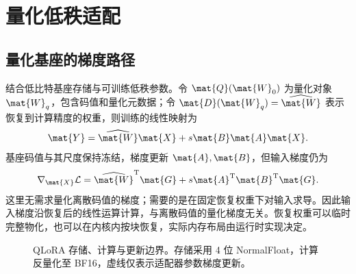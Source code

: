 \documentclass[../textbook.tex]{subfiles}
\begin{document}
\section{量化低秩适配}

\subsection{量化基座的梯度路径}
结合低比特基座存储与可训练低秩参数\cite{dettmers2023qlora}。令 $\mat{Q}(\mat{W}_0)$ 为量化对象 $\mat{W}_q$，包含码值和量化元数据；令 $\mat{D}(\mat{W}_q)=\widehat{\mat{W}}$ 表示恢复到计算精度的权重，则训练的线性映射为
\begin{equation}
\mat{Y}=\widehat{\mat{W}}\mat{X}+s\mat{B}\mat{A}\mat{X}.
\end{equation}
基座码值与其尺度保持冻结，梯度更新 $\mat{A},\mat{B}$，但输入梯度仍为
\begin{equation}
\nabla_{\mat{X}}\mathcal L=\widehat{\mat{W}}^{\mathrm{T}}\mat{G}+s\mat{A}^{\mathrm{T}}\mat{B}^{\mathrm{T}}\mat{G}.
\label{eq:peft-qlora-backward}
\end{equation}
这里无需求量化离散码值的梯度；需要的是在固定恢复权重下对输入求导。因此输入梯度沿恢复后的线性运算计算，与离散码值的量化梯度无关。恢复权重可以临时完整物化，也可以在内核内按块恢复，实际内存布局由运行时实现决定。

\begin{figure}[htbp]
\centering
{}
\caption[QLoRA 存储、计算与更新边界]{QLoRA 存储、计算与更新边界。存储采用 4 位 NormalFloat，计算反量化至 BF16，虚线仅表示适配器参数梯度更新。}\label{fig:peft-qlora-arch}
\end{figure}
\end{document}
